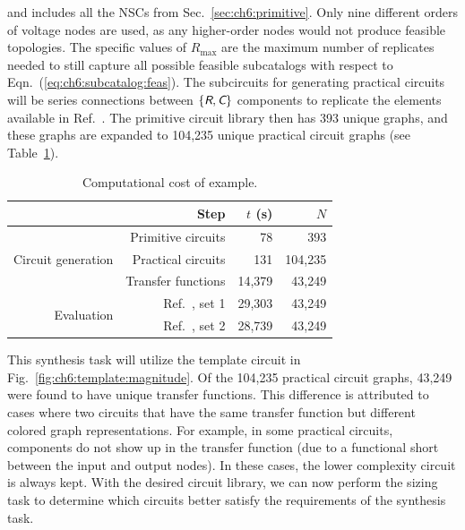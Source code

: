 \noindent and includes all the NSCs from Sec.~\ref{sec:ch6:primitive}.
Only nine different orders of voltage nodes are used, as any higher-order nodes would not produce feasible topologies.
The specific values of $R_{\max}$ are the maximum number of replicates needed to still capture all possible feasible subcatalogs with respect to Eqn.~(\ref{eq:ch6:subcatalog:feas}).
The subcircuits for generating practical circuits will be series connections between $\{\textsl{\textsf{R}}, \textsl{\textsf{C}}\}$ components to replicate the elements available in Ref.~\cite{Grimbleby1995a}.
The primitive circuit library then has 393 unique graphs, and these graphs are expanded to 104,235 unique practical circuit graphs (see Table~\ref{tb:ch6:mm1:computational}).

\begin{table}[ht]
\centering
\caption{Computational cost of  example.\label{tb:ch6:mm1:computational}}
\begin{tabular}{rrrr}
\hline \hline
                                    & Step                   & $t$ (s) & $N$ \\
\hline
\multirow{3}{*}{Circuit generation} & Primitive circuits     & 78 &  393 \\
                                    & Practical circuits     & 131  & 104,235  \\
                                    & Transfer functions     & 14,379  & 43,249   \\
 \multirow{2}{*}{Evaluation}        & Ref.~\cite{Grimbleby1995a}, set 1 & 29,303  & 43,249    \\
 & Ref.~\cite{Grimbleby1995a}, set 2 & 28,739  & 43,249    \\
\hline \hline
\end{tabular}
\end{table}

This synthesis task will utilize the template circuit in Fig.~\ref{fig:ch6:template:magnitude}.
Of the 104,235 practical circuit graphs, 43,249 were found to have unique transfer functions.
This difference is attributed to cases where two circuits that have the same transfer function but different colored graph representations.
For example, in some practical circuits, components do not show up in the transfer function (due to a functional short between the input and output nodes).
In these cases, the lower complexity circuit is always kept.
With the desired circuit library, we can now perform the sizing task to determine which circuits better satisfy the requirements of the synthesis task.

